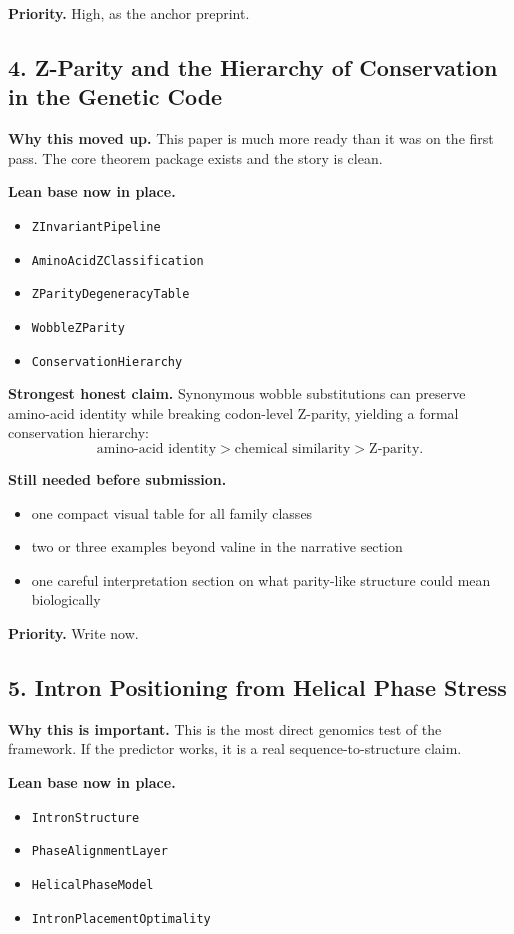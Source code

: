 \documentclass[11pt]{article}
\begin{document}
\textbf{Priority.} High, as the anchor preprint.

\subsection*{4. Z-Parity and the Hierarchy of Conservation in the Genetic Code}
\textbf{Why this moved up.} This paper is much more ready than it was on the first pass. The core theorem package exists and the story is clean.

\textbf{Lean base now in place.}
\begin{itemize}
\item \texttt{ZInvariantPipeline}
\item \texttt{AminoAcidZClassification}
\item \texttt{ZParityDegeneracyTable}
\item \texttt{WobbleZParity}
\item \texttt{ConservationHierarchy}
\end{itemize}

\textbf{Strongest honest claim.} Synonymous wobble substitutions can preserve amino-acid identity while breaking codon-level Z-parity, yielding a formal conservation hierarchy:
\[
\text{amino-acid identity} > \text{chemical similarity} > \text{Z-parity}.
\]

\textbf{Still needed before submission.}
\begin{itemize}
\item one compact visual table for all family classes
\item two or three examples beyond valine in the narrative section
\item one careful interpretation section on what parity-like structure could mean biologically
\end{itemize}

\textbf{Priority.} Write now.

\subsection*{5. Intron Positioning from Helical Phase Stress}
\textbf{Why this is important.} This is the most direct genomics test of the framework. If the predictor works, it is a real sequence-to-structure claim.

\textbf{Lean base now in place.}
\begin{itemize}
\item \texttt{IntronStructure}
\item \texttt{PhaseAlignmentLayer}
\item \texttt{HelicalPhaseModel}
\item \texttt{IntronPlacementOptimality}
\end{itemize}
\end{document}
